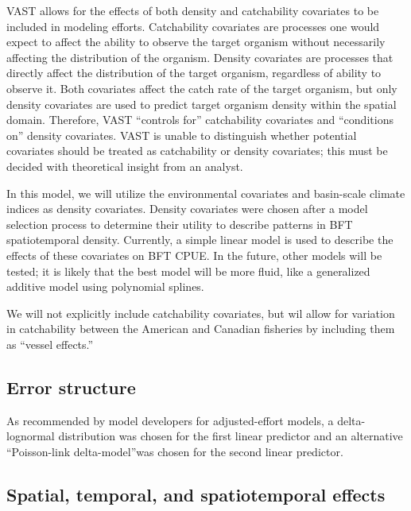 \documentclass[
]{article}
\begin{document}
VAST allows for the effects of both density and catchability covariates to be included in modeling efforts. Catchability covariates are processes one would expect to affect the ability to observe the target organism without necessarily affecting the distribution of the organism. Density covariates are processes that directly affect the distribution of the target organism, regardless of ability to observe it. Both covariates affect the catch rate of the target organism, but only density covariates are used to predict target organism density within the spatial domain. Therefore, VAST ``controls for'' catchability covariates and ``conditions on'' density covariates. VAST is unable to distinguish whether potential covariates should be treated as catchability or density covariates; this must be decided with theoretical insight from an analyst.

In this model, we will utilize the environmental covariates and basin-scale climate indices as density covariates. Density covariates were chosen after a model selection process to determine their utility to describe patterns in BFT spatiotemporal density. Currently, a simple linear model is used to describe the effects of these covariates on BFT CPUE. In the future, other models will be tested; it is likely that the best model will be more fluid, like a generalized additive model using polynomial splines.

We will not explicitly include catchability covariates, but wil allow for variation in catchability between the American and Canadian fisheries by including them as ``vessel effects.''

\hypertarget{error-structure}{%
\subsection{Error structure}\label{error-structure}}

As recommended by model developers for adjusted-effort models, a delta-lognormal distribution was chosen for the first linear predictor and an alternative ``Poisson-link delta-model''was chosen for the second linear predictor.

\hypertarget{spatial-temporal-and-spatiotemporal-effects}{%
\subsection{Spatial, temporal, and spatiotemporal effects}\label{spatial-temporal-and-spatiotemporal-effects}}
\end{document}
